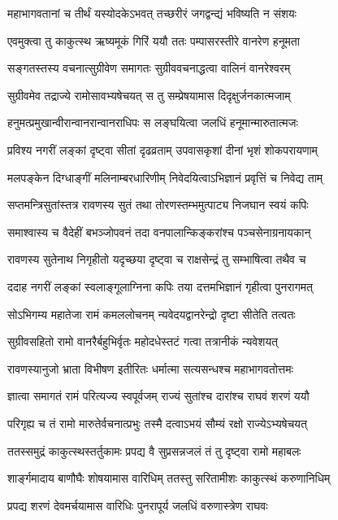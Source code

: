 \twolineshloka
{महाभागवतानां च तीर्थं यस्योदकेऽभवत्}
{तच्छरीरं जगद्वन्द्यं भविष्यति न संशयः}%

\twolineshloka
{एवमुक्त्वा तु काकुत्स्थ ऋष्यमूकं गिरिं ययौ}
{ततः पम्पासरस्तीरे वानरेण हनूमता}%

\twolineshloka
{सङ्गतस्तस्य वचनात्सुग्रीवेण समागतः}
{सुग्रीववचनाद्धत्वा वालिनं वानरेश्वरम्}%

\twolineshloka
{सुग्रीवमेव तद्राज्ये रामोसावभ्यषेचयत्}
{स तु सम्प्रेषयामास दिदृक्षुर्जनकात्मजाम्}%

\twolineshloka
{हनुमत्प्रमुखान्वीरान्वानरान्वानराधिपः}
{स लङ्घयित्वा जलधिं हनूमान्मारुतात्मजः}%

\twolineshloka
{प्रविश्य नगरीं लङ्कां दृष्ट्वा सीतां दृढव्रताम्}
{उपवासकृशां दीनां भृशं शोकपरायणाम्}%

\twolineshloka
{मलपङ्केन दिग्धाङ्गीं मलिनाम्बरधारिणीम्}
{निवेदयित्वाऽभिज्ञानं प्रवृत्तिं च निवेद्य ताम्}%

\twolineshloka
{सप्तमन्त्रिसुतांस्तत्र रावणस्य सुतं तथा}
{तोरणस्तम्भमुत्पाट्य निजघान स्वयं कपिः}%

\twolineshloka
{समाश्वास्य च वैदेहीं बभञ्जोपवनं तदा}
{वनपालान्किङ्करांश्च पञ्चसेनाग्रनायकान्}%

\twolineshloka
{रावणस्य सुतेनाथ निगृहीतो यदृच्छया}
{दृष्ट्वा च राक्षसेन्द्रं तु सम्भाषित्वा तथैव च}%

\twolineshloka
{ददाह नगरीं लङ्कां स्वलाङ्गूलाग्निना कपिः}
{तया दत्तमभिज्ञानं गृहीत्वा पुनरागमत्}%

\twolineshloka
{सोऽभिगम्य महातेजा रामं कमललोचनम्}
{न्यवेदयद्वानरेन्द्रो दृष्टा सीतेति तत्वतः}%

\twolineshloka
{सुग्रीवसहितो रामो वानरैर्बहुभिर्वृतः}
{महोदधेस्तटं गत्वा तत्रानीकं न्यवेशयत्}%

\twolineshloka
{रावणस्यानुजो भ्राता विभीषण इतीरितः}
{धर्मात्मा सत्यसन्धश्च महाभागवतोत्तमः}%

\twolineshloka
{ज्ञात्वा समागतं रामं परित्यज्य स्वपूर्वजम्}
{राज्यं सुतांश्च दारांश्च राघवं शरणं ययौ}%

\twolineshloka
{परिगृह्य च तं रामो मारुतेर्वचनात्प्रभुः}
{तस्मै दत्वाऽभयं सौम्यं रक्षो राज्येऽभ्यषेचयत्}%

\twolineshloka
{ततस्समुद्रं काकुत्स्थस्तर्तुकामः प्रपद्य वै}
{सुप्रसन्नजलं तं तु दृष्ट्वा रामो महाबलः}%

\twolineshloka
{शार्ङ्गमादाय बाणौघैः शोषयामास वारिधिम्}
{ततस्तु सरितामीशः काकुत्स्थं करुणानिधिम्}%

\twolineshloka
{प्रपद्य शरणं देवमर्चयामास वारिधिः}
{पुनरापूर्य जलधिं वरुणास्त्रेण राघवः}%

